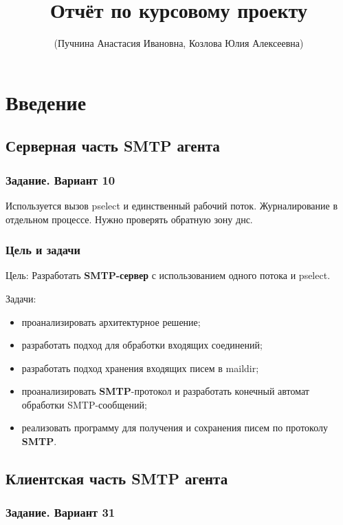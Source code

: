 \documentclass[a4paper,12pt]{report}
\title{Отчёт по курсовому проекту }
\author{(Пучнина Анастасия Ивановна, Козлова Юлия Алексеевна)}
\begin{document}
\maketitle

\tableofcontents

\chapter*{Введение}

\section{Серверная часть SMTP агента}

\subsection{Задание. Вариант 10}

Используется вызов pselect и единственный рабочий поток. Журналирование в отдельном процессе. Нужно проверять обратную зону днс.

\subsection{Цель и задачи}

Цель:
    Разработать \textbf{SMTP-сервер} с использованием одного потока и pselect.

Задачи:
\begin{itemize}
    \item проанализировать архитектурное решение;
    \item разработать подход для обработки входящих соединений;
    \item разработать подход хранения входящих писем в maildir;
    \item проанализировать \textbf{SMTP}-протокол и разработать конечный автомат обработки SMTP-сообщений;
    \item реализовать программу для получения и сохранения писем по протоколу \textbf{SMTP}.
\end{itemize}

\section{Клиентская часть SMTP агента}

\subsection{Задание. Вариант 31}
\end{document}
